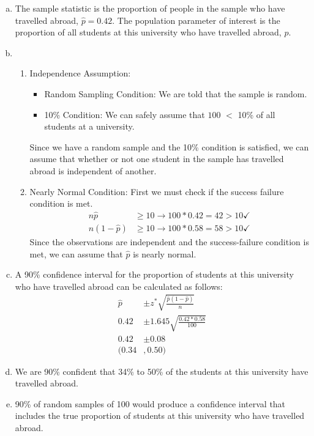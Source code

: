 {
\begin{enumerate}[(a)]

\item The sample statistic is the proportion of people in the sample who have travelled abroad, $\hat{p} = 0.42$. The population parameter of interest is the proportion of all students at this university who have travelled abroad, $p$.

\item 
\begin{enumerate}[1.]
\item Independence Assumption: 
\begin{itemize}
\item Random Sampling Condition: We are told that the sample is random.
\item 10\% Condition: We can safely assume that $100$ $<$ 10\% of all students at a university.
\end{itemize}
Since we have a random sample and the 10\% condition is satisfied, we can assume that whether or not one student in the sample has travelled abroad is independent of another.
\item Nearly Normal Condition: First we must check if the success failure condition is met.
\begin{align*}
n\hat{p} &\ge 10 \rightarrow 100 * 0.42 = 42 > 10 \checkmark \\
n(1 - \hat{p}) &\ge 10 \rightarrow 100 * 0.58 = 58 > 10 \checkmark
\end{align*}
Since the observations are independent and the success-failure condition is met, we can assume that $\hat{p}$ is nearly normal.
\end{enumerate}

\item A 90\% confidence interval for the proportion of students at this university who have travelled abroad can be calculated as follows:
\begin{align*}
\hat{p} &\pm z^* \sqrt{ \frac{\hat{p} (1 - \hat{p})} {n} } \\
0.42 &\pm 1.645 \sqrt{ \frac{0.42 * 0.58}{100}} \\
0.42 &\pm 0.08 \\
(0.34&, 0.50)
\end{align*}

\item We are 90\% confident that 34\% to 50\% of the students at this university have travelled abroad.

\item 90\% of random samples of 100 would produce a confidence interval that includes the true proportion of students at this university who have travelled abroad.

\end{enumerate}
}\label{univTravelAbroad}

